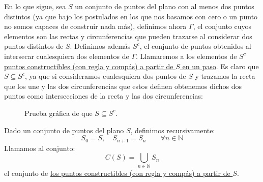 \noindent
En lo que sigue, sea $S$ un conjunto de puntos del plano con al menos dos puntos distintos (ya que bajo los postulados en los que nos basamos con cero o un punto no somos capaces de construir nada más), definimos ahora $\Gamma$, el conjunto cuyos elementos son las rectas y circunferencias que pueden trazarse al considerar dos puntos distintos de $S$. Definimos además $S^c$, el conjunto de puntos obtenidos al intersecar cualesquiera dos elementos de $\Gamma$. Llamaremos a los elementos de $S^c$ \underline{puntos constructibles (con regla y compás) a partir de $S$ en un paso}. Es claro que $S\subseteq S^c$, ya que si consideramos cualesquiera dos puntos de $S$ y trazamos la recta que los une y las dos circunferencias que estos definen obtenemos dichos dos puntos como intersecciones de la recta y las dos circunferencias:

\begin{figure}[H]
    \centering
        \caption{Prueba gráfica de que $S\subseteq S^c$.}
\end{figure}

\begin{definicion}
    Dado un conjunto de puntos del plano $S$, definimos recursivamente:
    \begin{equation*}
        S_0 = S, \quad S_{n+1} = S_n \qquad \forall n\in \mathbb{N}
    \end{equation*}
    Llamamos al conjunto:
    \begin{equation*}
        C(S) = \bigcup_{n\in \mathbb{N}}S_n
    \end{equation*}
    el conjunto de \underline{los puntos constructibles (con regla y compás) a partir de $S$}.
\end{definicion}

